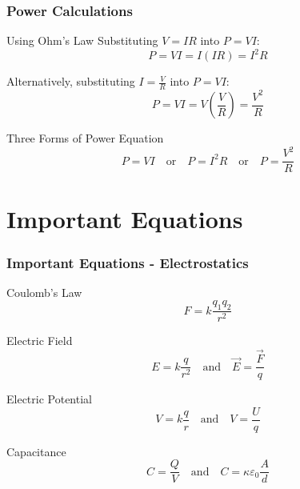 \documentclass{beamer}
\begin{document}
\begin{frame}
    \frametitle{Power Calculations}
    \begin{block}{Using Ohm's Law}
        Substituting $V = IR$ into $P = VI$:
        \begin{equation}
            P = VI = I(IR) = I^2R
        \end{equation}
        
        Alternatively, substituting $I = \frac{V}{R}$ into $P = VI$:
        \begin{equation}
            P = VI = V\left(\frac{V}{R}\right) = \frac{V^2}{R}
        \end{equation}
    \end{block}
    
    \begin{block}{Three Forms of Power Equation}
        \begin{equation}
            P = VI \quad \text{or} \quad P = I^2R \quad \text{or} \quad P = \frac{V^2}{R}
        \end{equation}
    \end{block}
\end{frame}

\section{Important Equations}

\begin{frame}
    \frametitle{Important Equations - Electrostatics}
    \begin{block}{Coulomb's Law}
        \begin{equation}
            F = k\frac{q_1 q_2}{r^2}
        \end{equation}
    \end{block}
    
    \begin{block}{Electric Field}
        \begin{equation}
            E = k\frac{q}{r^2} \quad \text{and} \quad \vec{E} = \frac{\vec{F}}{q}
        \end{equation}
    \end{block}
    
    \begin{block}{Electric Potential}
        \begin{equation}
            V = k\frac{q}{r} \quad \text{and} \quad V = \frac{U}{q}
        \end{equation}
    \end{block}
    
    \begin{block}{Capacitance}
        \begin{equation}
            C = \frac{Q}{V} \quad \text{and} \quad C = \kappa\varepsilon_0\frac{A}{d}
        \end{equation}
    \end{block}
\end{frame}
\end{document}
